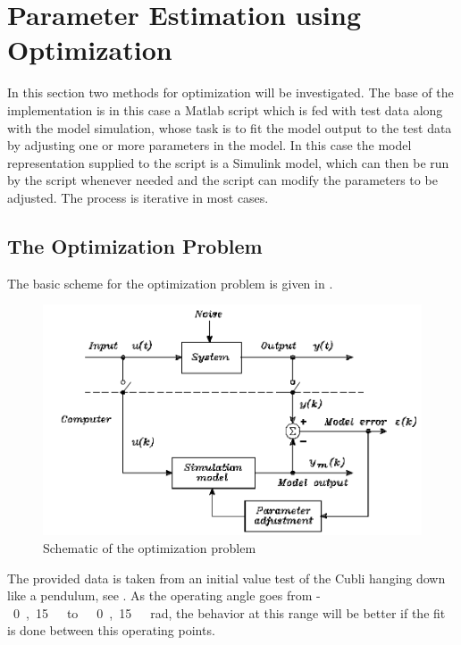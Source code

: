 \section{Parameter Estimation using Optimization}
In this section two methods for optimization will be investigated. The base of the implementation is in this case a Matlab script which is fed with test data along with the model simulation, whose task is to fit the model output to the test data by adjusting one or more parameters in the model. In this case the model representation supplied to the script is a Simulink model, which can then be run by the script whenever needed and the script can modify the parameters to be adjusted. The process is iterative in most cases.

\subsection{The Optimization Problem}
The basic scheme for the optimization problem is given in .
%
\begin{figure}[H]
	\centering
	\includegraphics[scale=0.4]{figures/SensToolSchema}
	\caption{Schematic of the optimization problem}
	\label{SensToolSchema}
\end{figure}
%
The provided data is taken from an initial value test of the Cubli hanging down like a pendulum, see .
As the operating angle goes from \si{-0,15\ to\ 0,15\ rad}, the behavior at this range will be better if the fit is done between this operating points. 

